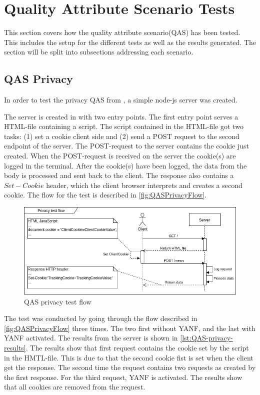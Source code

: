 \documentclass[main.tex]{subfiles}
\begin{document}
\label{sec:QASTest}
\section{Quality Attribute Scenario Tests}
% 
This section covers how the quality attribute scenario(QAS) has been tested. This includes the setup for the different tests as well as the results generated. 
The section will be split into subsections addressing each scenario.

\subsection{QAS Privacy}
\label{sec:PrivacyTest}
In order to test the privacy QAS from , a simple node-js server was created. 

The server is created in with two entry points. The first entry point serves a HTML-file containing a script. The script contained in the HTML-file got two tasks: (1) set a cookie client side and (2) send a POST request to the second endpoint of the server. The POST-request to the server contains the cookie just created. When the POST-request is received on the server the cookie(s) are logged in the terminal. After the cookie(s) have been logged, the data from the body is processed and sent back to the client. The response also contains a \(Set-Cookie\) header, which the client browser interprets and creates a second cookie. The flow for the test is described in \autoref{fig:QASPrivacyFlow}.

\begin{figure}[h]
    \centering
    \includegraphics{Images/QAS-Test/QASPrivacyFlow.png}
    \caption{QAS privacy test flow}
    \label{fig:QASPrivacyFlow}
\end{figure}

The test was conducted by going through the flow described in \autoref{fig:QASPrivacyFlow} three times. The two first without YANF, and the last with YANF activated. The results from the server is shown in \autoref{lst:QAS-privacy-results}. The results show that first request contains the cookie set by the script in the HMTL-file. This is due to that the second cookie fist is set when the client get the response. The second time the request contains two requests as created by the first response. For the third request, YANF is activated. The results show that all cookies are removed from the request.
\end{document}
